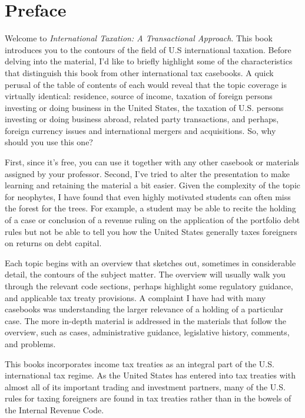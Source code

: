 \chapter{Preface}

Welcome to \textit{International Taxation: A Transactional Approach}.  This book introduces you to the contours of the field of U.S international taxation.  Before delving into the material, I'd like to briefly highlight some of the characteristics that distinguish this book from other international tax casebooks.  A quick perusal of the table of contents of each would reveal that the topic coverage is virtually identical:  residence, source of income, taxation of foreign persons investing or doing business in the United States, the taxation of U.S. persons investing or doing business abroad, related party transactions, and perhaps, foreign currency issues and international mergers and acquisitions.  So, why should you use this one?  

First, since it's free, you can use it together with any other casebook  or materials assigned by your professor.  Second, I've tried to alter the presentation to make learning and retaining the material a bit easier.  Given the complexity of the topic for neophytes, I have found that even highly motivated students can often miss the forest for the trees.  For example, a student may be able to recite the holding of a case or conclusion of a revenue ruling on the application of the portfolio debt rules but not be able to tell you how the United States generally taxes foreigners on returns on debt capital.  

Each topic begins with an overview that sketches out, sometimes in considerable detail, the contours of the subject matter.  The overview will usually walk you through the relevant code sections, perhaps highlight some regulatory guidance, and applicable tax treaty provisions.  A complaint I have had with many casebooks was understanding the larger relevance of a holding of a particular case.  The more in-depth material is addressed in the materials that follow the overview, such as cases, administrative guidance, legislative history, comments, and problems.  

This books incorporates income tax treaties as an integral part of the U.S. international tax regime.  As the United States has entered into tax treaties with almost all of its important  trading and investment partners, many of the U.S. rules for taxing foreigners are found in tax treaties rather than in the bowels of the Internal Revenue Code.  

